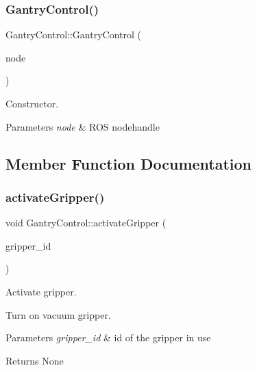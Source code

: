 \subsubsection{\texorpdfstring{Gantry\+Control()}{GantryControl()}}
{\footnotesize\ttfamily Gantry\+Control\+::\+Gantry\+Control (\begin{DoxyParamCaption}\item[{ros\+::\+Node\+Handle \&}]{node }\end{DoxyParamCaption})}



Constructor. 


\begin{DoxyParams}{Parameters}
{\em node} & R\+OS nodehandle \\
\hline
\end{DoxyParams}


\subsection{Member Function Documentation}
\mbox{\label{classGantryControl_aaccd9c43b5564c198288ba51cbcecabe}} 
\subsubsection{\texorpdfstring{activate\+Gripper()}{activateGripper()}}
{\footnotesize\ttfamily void Gantry\+Control\+::activate\+Gripper (\begin{DoxyParamCaption}\item[{std\+::string}]{gripper\+\_\+id }\end{DoxyParamCaption})}



Activate gripper. 

Turn on vacuum gripper.


\begin{DoxyParams}{Parameters}
{\em gripper\+\_\+id} & id of the gripper in use \\
\hline
\end{DoxyParams}
\begin{DoxyReturn}{Returns}
None 
\end{DoxyReturn}
\mbox{\label{classGantryControl_a31672ce076ba59662af6c77c82ab136f}} 
